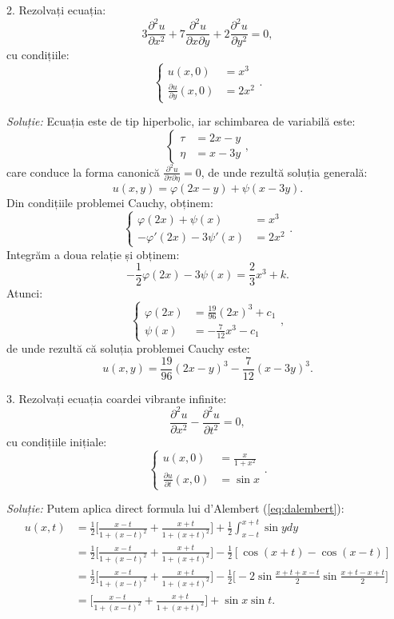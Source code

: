 \documentclass[11pt,a4paper]{article}
\theoremstyle{dotless}
\theoremstyle{dotlessdr}
\begin{document}
\vspace{1cm}

2. Rezolvați ecuația:
\[
  3 \frac{\partial^2 u}{\partial x^2} + 7 \frac{\partial^2 u}{\partial x\partial y} + %
  2 \frac{\partial^2 u}{\partial y^2} = 0,
\]
cu condițiile:
\[
  \begin{cases}
    u(x, 0) &= x^3 \\
    \frac{\partial u}{\partial y}(x, 0) &= 2x^2
  \end{cases}.
\]

\vspace{1cm}

\emph{Soluție:} Ecuația este de tip hiperbolic, iar schimbarea de variabilă este:
\[
  \begin{cases}
    \tau &= 2x - y \\
    \eta &= x - 3y
  \end{cases},
\]
care conduce la forma canonică $ \frac{\partial^2 u}{\partial \tau\partial \eta} = 0 $,
de unde rezultă soluția generală:
\[
  u(x, y) = \varphi(2x - y) + \psi(x - 3y).
\]
Din condițiile problemei Cauchy, obținem:
\[
  \begin{cases}
    \varphi(2x) + \psi(x) &= x^3 \\
    -\varphi'(2x) - 3 \psi'(x) &= 2x^2
  \end{cases}.
\]
Integrăm a doua relație și obținem:
\[
  -\frac{1}{2} \varphi(2x) - 3 \psi(x) = \frac{2}{3}x^3 + k.
\]
Atunci:
\[
  \begin{cases}
    \varphi(2x) &= \frac{19}{96}(2x)^3 + c_1 \\
    \psi(x) &= -\frac{7}{12}x^3 - c_1
  \end{cases},
\]
de unde rezultă că soluția problemei Cauchy este:
\[
  u(x, y) = \frac{19}{96}(2x - y)^3 - \frac{7}{12}(x - 3y)^3.
\]

3. Rezolvați ecuația coardei vibrante infinite:
\[
  \frac{\partial^2 u}{\partial x^2} - \frac{\partial^2 u}{\partial t^2} = 0,
\]
cu condițiile inițiale:
\[
  \begin{cases}
    u(x, 0) &= \frac{x}{1 + x^2} \\
    \frac{\partial u}{\partial t}(x, 0) &= \sin x
  \end{cases}.
\]

\vspace{1cm}

\emph{Soluție:} Putem aplica direct formula lui d'Alembert (\ref{eq:dalembert}):
\begin{align*}
  u(x, t) &= \frac{1}{2} \Big[ \frac{x - t}{1 + (x - t)^2} + \frac{x + t}{1 + (x + t)^2} \Big] + %
            \frac{1}{2} \int_{x - t}^{x + t} \sin y dy \\
          &= \frac{1}{2} \Big[ \frac{x - t}{1 + (x - t)^2} + \frac{x + t}{1 + (x + t)^2} \Big] - %
            \frac{1}{2}[\cos(x + t) - \cos(x - t)] \\
          &= \frac{1}{2} \Big[ \frac{x - t}{1 + (x - t)^2} + \frac{x + t}{1 + (x + t)^2} \Big] - %
            \frac{1}{2} \Big[ -2\sin \frac{x + t + x - t}{2} \sin \frac{x + t - x + t}{2} \Big] \\
          &= \Big[ \frac{x - t}{1 + (x - t)^2} + \frac{x + t}{1 + (x + t)^2} \Big] + \sin x \sin t.
\end{align*}
\end{document}
